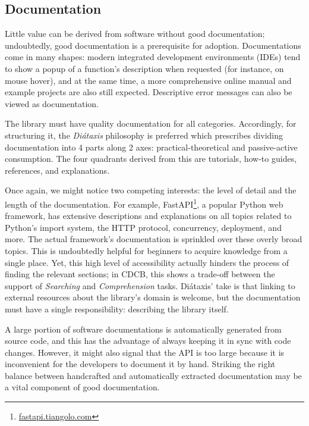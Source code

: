 \subsection{Documentation}

Little value can be derived from software without good documentation; undoubtedly, good documentation is a prerequisite for adoption. Documentations come in many shapes: modern integrated development environments (IDEs) tend to show a popup of a function's description when requested (for instance, on mouse hover), and at the same time, a more comprehensive online manual and example projects are also still expected. Descriptive error messages can also be viewed as documentation.

The library must have quality documentation for all categories. Accordingly, for structuring it, the \textit{Diátaxis} philosophy is preferred \cite{Procida_Diataxis_documentation_framework} which prescribes dividing documentation into 4 parts along 2 axes: practical-theoretical and passive-active consumption. The four quadrants derived from this are tutorials, how-to guides, references, and explanations.

Once again, we might notice two competing interests: the level of detail and the length of the documentation. For example, FastAPI\footnote{\href{https://fastapi.tiangolo.com/async/\#concurrent-burgers}{fastapi.tiangolo.com}}, a popular Python web framework, has extensive descriptions and explanations on all topics related to Python's import system, the HTTP protocol, concurrency, deployment, and more. The actual framework's documentation is sprinkled over these overly broad topics. This is undoubtedly helpful for beginners to acquire knowledge from a single place. Yet, this high level of accessibility actually hinders the process of finding the relevant sections; in CDCB, this shows a trade-off between the support of \textit{Searching} and \textit{Comprehension} tasks. Diátaxis' take is that linking to external resources about the library's domain is welcome, but the documentation must have a single responsibility: describing the library itself.

A large portion of software documentations is automatically generated from source code, and this has the advantage of always keeping it in sync with code changes. However, it might also signal that the API is too large because it is inconvenient for the developers to document it by hand. Striking the right balance between handcrafted and automatically extracted documentation may be a vital component of good documentation.

